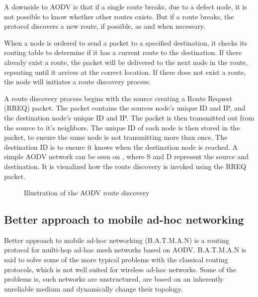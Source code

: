 A downside to AODV is that if a single route breaks, due to a defect node, it is not possible to know whether other routes exists.
But if a route breaks, the protocol discovers a new route, if possible, as and when necessary.

When a node is ordered to send a packet to a specified destination, it checks its routing table to determine if it has a current route to the destination.
If there already exist a route, the packet will be delivered to the next node in the route, repeating until it arrives at the correct location.
If there does not exist a route, the node will initiates a route discovery process\cite{AOVD1}.

A route discovery process begins with the source creating a Route Request (RREQ) packet.
The packet contains the sources node's unique ID and IP, and the destination node's unique ID and IP.
The packet is then transmitted out from the source to it's neighbors.
The unique ID of each node is then stored in the packet, to ensure the same node is not transmitting more than once.
The destination ID is to ensure it knows when the destination node is reached.
A simple AODV network can be seen on , where S and D represent the source and destination. It is visualized how the route discovery is invoked using the RREQ packet.\cite{AOVD2}

\begin{figure}[!h]
	\centering
	\caption{Illustration of the AODV route discovery}
	\label{fig:AODVfigure}
\end{figure}

\subsection{Better approach to mobile ad-hoc networking}
Better approach to mobile ad-hoc networking (B.A.T.M.A.N) is a routing protocol for multi-hop ad-hoc mesh networks based on AODV. 
B.A.T.M.A.N is said to solve some of the more typical problems with the classical routing protocols, which is not well suited for wireless ad-hoc networks.
Some of the problems is, such networks  are unstructured, are based on an inherently unreliable medium and dynamically change their topology.

